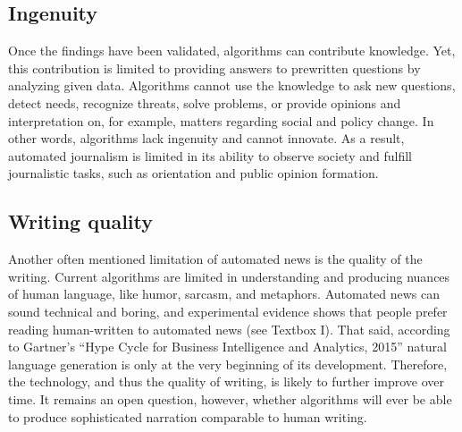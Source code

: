 \documentclass[notoc, symmetric, nobib, nols]{towcenter-guideto-book}
\begin{document}
\subsection{Ingenuity}

Once the findings have been validated, algorithms can contribute knowledge. Yet, this contribution is limited to providing answers to prewritten questions by analyzing given data. Algorithms cannot use the knowledge to ask new questions, detect needs, recognize threats, solve problems, or provide opinions and interpretation on, for example, matters regarding social and policy change. In other words, algorithms lack ingenuity and cannot innovate. As a result, automated journalism is limited in its ability to observe society and fulfill journalistic tasks, such as orientation and public opinion formation.\autocite{latar15}  

\subsection{Writing quality}

Another often mentioned limitation of automated news is the quality of the writing. Current algorithms are limited in understanding and producing nuances of human language, like humor, sarcasm, and metaphors. Automated news can sound technical and boring, and experimental evidence shows that people prefer reading human-written to automated news (see Textbox I). That said, according to Gartner's ``Hype Cycle for Business Intelligence and Analytics, 2015'' natural language generation is only at the very beginning of its development.\autocite{schlegel15} Therefore, the technology, and thus the quality of writing, is likely to further improve over time. It remains an open question, however, whether algorithms will ever be able to produce sophisticated narration comparable to human writing.\autocite{latar15}
\end{document}
